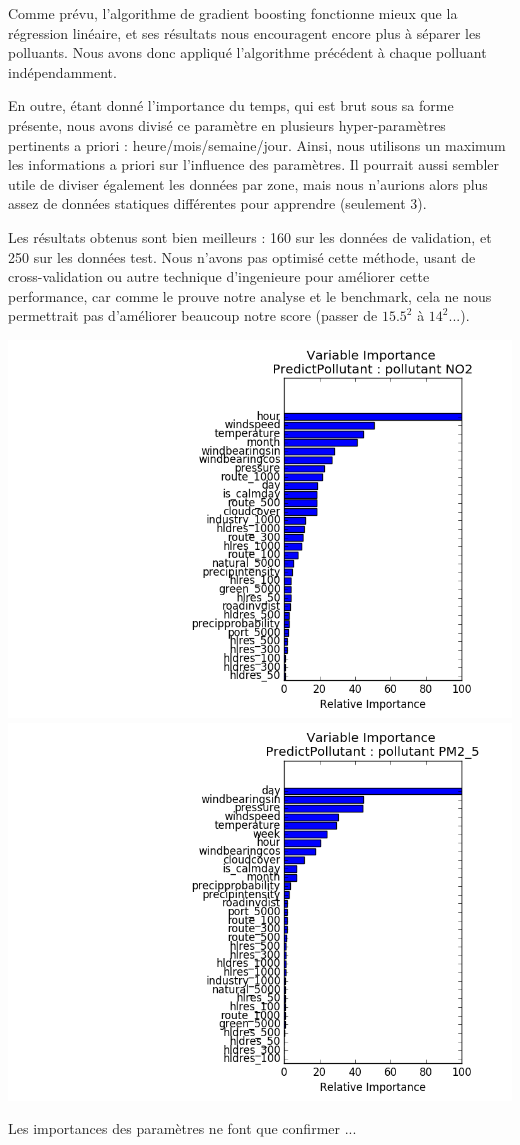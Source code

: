 \documentclass{beamer}
\begin{document}
\begin{frame}

Comme prévu, l'algorithme de gradient boosting fonctionne mieux que la régression linéaire, et ses résultats nous encouragent encore plus à séparer les polluants. Nous avons donc appliqué l'algorithme précédent à chaque polluant indépendamment. 

En outre, étant donné l'importance du temps, qui est brut sous sa forme présente, nous avons divisé ce paramètre en plusieurs hyper-paramètres pertinents a priori : heure/mois/semaine/jour. Ainsi, nous utilisons un maximum les informations a priori sur l'influence des paramètres. Il pourrait aussi sembler utile de diviser également les données par zone, mais nous n'aurions alors plus assez de données statiques différentes pour apprendre (seulement 3).  

Les résultats obtenus sont bien meilleurs : 160 sur les données de validation, et 250 sur les données test. Nous n'avons pas optimisé cette méthode, usant de cross-validation ou autre technique d'ingenieure pour améliorer cette performance, car comme le prouve notre analyse et le benchmark, cela ne nous permettrait pas d'améliorer beaucoup notre score (passer de $15.5^2$ à $14^2$...).

\begin{center}
	\includegraphics[width=0.3\linewidth]{images/NO2.png}
	\includegraphics[width=0.3\linewidth]{images/PM25.png}
\end{center}

Les importances des paramètres ne font que confirmer ...
\end{frame}
\end{document}
